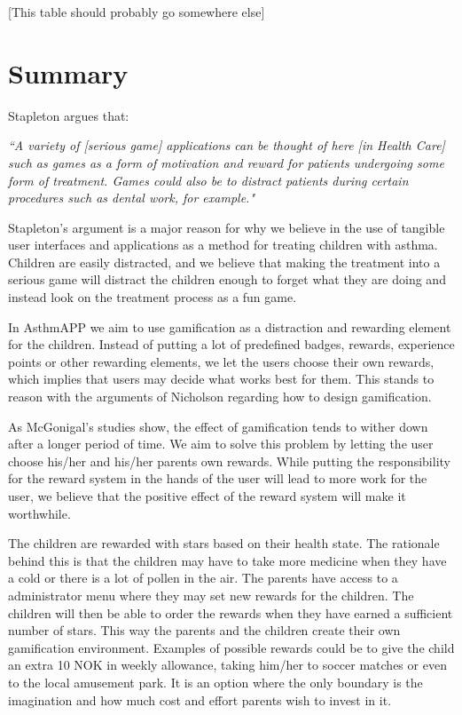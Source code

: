 [This table should probably go somewhere else]


\section{Summary}
\label{sec:gamificationinapp}

Stapleton argues that:

\textit{``A variety of [serious game] applications can be thought of here [in Health Care] such as games as a form of motivation and reward for patients undergoing some form of treatment. Games could also be to distract patients during certain procedures such as dental work, for example."}\cite{stapleton2004serious}


Stapleton's argument is a major reason for why we believe in the use of tangible user interfaces and applications as a method for treating children with asthma. Children are easily distracted, and we believe that making the treatment into a serious game will distract the children enough to forget what they are doing and instead look on the treatment process as a fun game.


In AsthmAPP we aim to use gamification as a distraction and rewarding element for the children. Instead of putting a lot of predefined badges, rewards, experience points or other rewarding elements, we let the users choose their own rewards, which implies that users may decide what works best for them. This stands to reason with the arguments of Nicholson\cite{nicholson2012user} regarding how to design gamification.

As McGonigal's studies show, the effect of gamification tends to wither down after a longer period of time\cite{jane2011reality}. We aim to solve this problem by letting the user choose his/her and his/her parents own rewards. While putting the responsibility for the reward system in the hands of the user will lead to more work for the user, we believe that the positive effect of the reward system will make it worthwhile. 
 

The children are rewarded with stars based on their health state. The rationale behind this is that the children may have to take more medicine when they have a cold or there is a lot of pollen in the air. The parents have access to a administrator menu where they may set new rewards for the children. The children will then be able to order the rewards when they have earned a sufficient number of stars. This way the parents and the children create their own gamification environment. Examples of possible rewards could be to give the child an extra 10 NOK in weekly allowance, taking him/her to soccer matches or even to the local amusement park. It is an option where the only boundary is the imagination and how much cost and effort parents wish to invest in it.    


